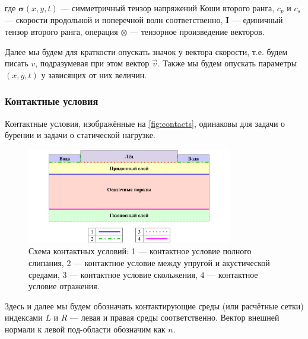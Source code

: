 \noindent где $\pmb{\sigma}(x,y,t)$ --- симметричный тензор напряжений Коши второго ранга, $c_p$ и $c_s$ --- скорости продольной и поперечной волн соответственно, $\pmb{I}$ --- единичный тензор второго ранга, операция $\otimes$ --- тензорное произведение векторов.

Далее мы будем для краткости опускать значок у вектора скорости, т.е. будем писать $v$, подразумевая при этом вектор $\vec{v}$. Также мы будем опускать параметры $(x,y,t)$ у зависящих от них величин.

\subsubsection{Контактные условия}

Контактные условия, изображённые на \autoref{fig:contacts}, одинаковы для задачи о бурении и задачи о статической нагрузке.

\begin{figure}[htb]
    \centering
    \includegraphics[width=0.8\textwidth]
    {images/gas_field/contacts.png}
    \caption{Схема контактных условий: 1 --- контактное условие полного слипания, 2 --- контактное условие между упругой и акустической средами, 3 --- контактное условие скольжения, 4 --- контактное условие отражения.}
    \label{fig:contacts}
\end{figure}

Здесь и далее мы будем обозначать контактирующие среды (или расчётные сетки) индексами $L$ и $R$ --- левая и правая среды соответственно. Вектор внешней нормали к левой под-области обозначим как $n$.

